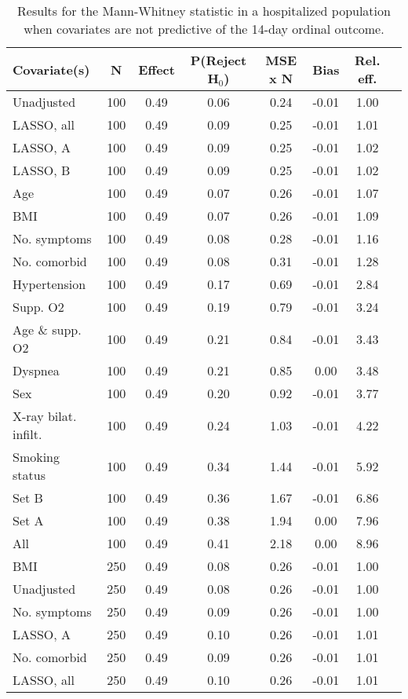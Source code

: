\documentclass{article}
\begin{document}
{\tabcolsep=6pt  %
\begin{longtable}{lccccccc}
\caption{Results for the Mann-Whitney statistic in a hospitalized population when covariates are not predictive of the 14-day ordinal outcome.}\label{tab14}\\
Covariate(s) & N & Effect & P(Reject H$_0$) & MSE x N & Bias & Rel. eff.\\ \midrule
Unadjusted & 100 & 0.49 & 0.06 & 0.24 & -0.01 & 1.00\\
LASSO, all & 100 & 0.49 & 0.09 & 0.25 & -0.01 & 1.01\\
LASSO, A & 100 & 0.49 & 0.09 & 0.25 & -0.01 & 1.02\\
LASSO, B & 100 & 0.49 & 0.09 & 0.25 & -0.01 & 1.02\\
Age & 100 & 0.49 & 0.07 & 0.26 & -0.01 & 1.07\\
BMI & 100 & 0.49 & 0.07 & 0.26 & -0.01 & 1.09\\
No. symptoms & 100 & 0.49 & 0.08 & 0.28 & -0.01 & 1.16\\
No. comorbid & 100 & 0.49 & 0.08 & 0.31 & -0.01 & 1.28\\
Hypertension & 100 & 0.49 & 0.17 & 0.69 & -0.01 & 2.84\\
Supp. O2 & 100 & 0.49 & 0.19 & 0.79 & -0.01 & 3.24\\
Age \& supp. O2 & 100 & 0.49 & 0.21 & 0.84 & -0.01 & 3.43\\
Dyspnea & 100 & 0.49 & 0.21 & 0.85 & 0.00 & 3.48\\
Sex & 100 & 0.49 & 0.20 & 0.92 & -0.01 & 3.77\\
X-ray bilat. infilt. & 100 & 0.49 & 0.24 & 1.03 & -0.01 & 4.22\\
Smoking status & 100 & 0.49 & 0.34 & 1.44 & -0.01 & 5.92\\
Set B & 100 & 0.49 & 0.36 & 1.67 & -0.01 & 6.86\\
Set A & 100 & 0.49 & 0.38 & 1.94 & 0.00 & 7.96\\
All & 100 & 0.49 & 0.41 & 2.18 & 0.00 & 8.96\\ \midrule
BMI & 250 & 0.49 & 0.08 & 0.26 & -0.01 & 1.00\\
Unadjusted & 250 & 0.49 & 0.08 & 0.26 & -0.01 & 1.00\\
No. symptoms & 250 & 0.49 & 0.09 & 0.26 & -0.01 & 1.00\\
LASSO, A & 250 & 0.49 & 0.10 & 0.26 & -0.01 & 1.01\\
No. comorbid & 250 & 0.49 & 0.09 & 0.26 & -0.01 & 1.01\\
LASSO, all & 250 & 0.49 & 0.10 & 0.26 & -0.01 & 1.01\\

\end{longtable}}
\end{document}
